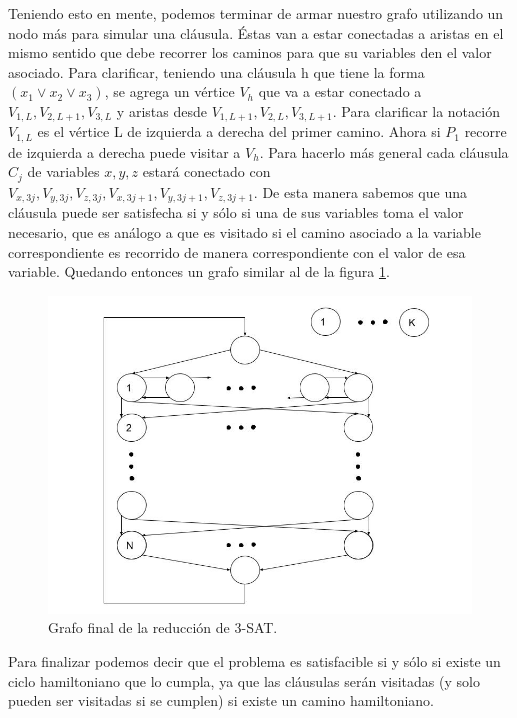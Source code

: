 \documentclass[a4paper,10pt]{article}
\begin{document}
	Teniendo esto en mente, podemos terminar de armar nuestro grafo utilizando un nodo más para simular una cláusula. Éstas van a estar conectadas a aristas en el mismo sentido que debe recorrer los caminos para que su variables den el valor asociado. Para clarificar, teniendo una cláusula h que tiene la forma $(x_1 \vee x_2 \vee x_3)$, se agrega un vértice $V_h$ que va a estar conectado a $V_{1,L}, V_{2,L+1}, V_{3,L}$ y aristas desde $V_{1,L+1}, V_{2,L}, V_{3,L+1}$. Para clarificar la notación $V_{1,L}$ es el vértice L de izquierda a derecha del primer camino. Ahora si $P_1$ recorre de izquierda a derecha puede visitar a $V_h$. Para hacerlo más general cada cláusula $C_j$ de variables $x, y, z$ estará conectado con $V_{x,3j}, V_{y,3j}, V_{z,3j}, V_{x,3j+1}, V_{y,3j+1}, V_{z,3j+1}$. De esta manera sabemos que una cláusula puede ser satisfecha si y sólo si una de sus variables toma el valor necesario, que es análogo a que es visitado si el camino asociado a la variable correspondiente es recorrido de manera correspondiente con el valor de esa variable. Quedando entonces un grafo similar al de la figura \ref{fig:punto-3-2}.

	\begin{figure}[!htb]
		\centering
		\includegraphics[scale=0.5]{images/grafo-3-2.jpg}
		\caption{Grafo final de la reducción de 3-SAT.}
		\label{fig:punto-3-2}
	\end{figure}

	Para finalizar podemos decir que el problema es satisfacible si y sólo si existe un ciclo hamiltoniano que lo cumpla, ya que las cláusulas serán visitadas (y solo pueden ser visitadas si se cumplen) si existe un camino hamiltoniano.
\end{document}
